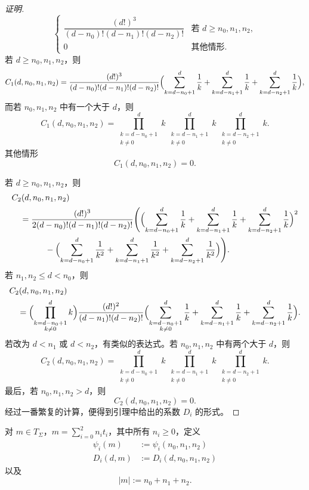 \begin{proof}[证明]
\[\begin{cases}
    \dfrac{(d!)^3}{(d-n_0)!(d-n_1)!(d-n_2)!} & \text{若 } d\ge n_0,n_1,n_2,\\[2mm]
    0 & \text{其他情形}.
  \end{cases}
\]
若 $d\ge n_0,n_1,n_2$，则
\[
  C_1(d,n_0,n_1,n_2)=\frac{(d!)^3}{(d-n_0)!(d-n_1)!(d-n_2)!}
  \Bigl(\sum_{k=d-n_0+1}^{d}\frac1k+\sum_{k=d-n_1+1}^{d}\frac1k+\sum_{k=d-n_2+1}^{d}\frac1k\Bigr),
\]
而若 $n_0,n_1,n_2$ 中有一个大于 $d$，则
\[
  C_1(d,n_0,n_1,n_2)=\prod_{\substack{k=d-n_0+1\\ k\ne 0}}^{d}k\ \prod_{\substack{k=d-n_1+1\\ k\ne 0}}^{d}k\ \prod_{\substack{k=d-n_2+1\\ k\ne 0}}^{d}k.
\]
其他情形
\[
  C_1(d,n_0,n_1,n_2)=0.
\]

若 $d\ge n_0,n_1,n_2$，则
\begin{align*}
  &C_2(d,n_0,n_1,n_2)\\
  &\quad =\frac{(d!)^3}{2(d-n_0)!(d-n_1)!(d-n_2)!}
    \Biggl(\Bigl(\sum_{k=d-n_0+1}^{d}\frac1k+\sum_{k=d-n_1+1}^{d}\frac1k+\sum_{k=d-n_2+1}^{d}\frac1k\Bigr)^2\\
  &\qquad\qquad -\Bigl(\sum_{k=d-n_0+1}^{d}\frac1{k^2}+\sum_{k=d-n_1+1}^{d}\frac1{k^2}+\sum_{k=d-n_2+1}^{d}\frac1{k^2}\Bigr)\Biggr).
\end{align*}
若 $n_1,n_2\le d<n_0$，则
\begin{align*}
  &C_2(d,n_0,n_1,n_2)\\
  &\quad =\Bigl(\prod_{\substack{k=d-n_0+1\\ k\ne 0}}^{d}k\Bigr)\frac{(d!)^2}{(d-n_1)!(d-n_2)!}
    \Bigl(\sum_{\substack{k=d-n_0+1\\ k\ne 0}}^{d}\frac1k+\sum_{k=d-n_1+1}^{d}\frac1k+\sum_{k=d-n_2+1}^{d}\frac1k\Bigr).
\end{align*}
若改为 $d<n_1$ 或 $d<n_2$，有类似的表达式。若 $n_0,n_1,n_2$ 中有两个大于 $d$，则
\[
  C_2(d,n_0,n_1,n_2)=\prod_{\substack{k=d-n_0+1\\ k\ne 0}}^{d}k\ \prod_{\substack{k=d-n_1+1\\ k\ne 0}}^{d}k\ \prod_{\substack{k=d-n_2+1\\ k\ne 0}}^{d}k.
\]
最后，若 $n_0,n_1,n_2>d$，则
\[
  C_2(d,n_0,n_1,n_2)=0.
\]
经过一番繁复的计算，便得到引理中给出的系数 $D_i$ 的形式。
\end{proof}

\begin{definition}
  对 $m\in T_\Sigma$，$m=\sum_{i=0}^2n_it_i$，其中所有 $n_i\ge 0$，定义
  \begin{align*}
    \psi_i(m)&:=\psi_i(n_0,n_1,n_2)\\
    D_i(d,m)&:=D_i(d,n_0,n_1,n_2)
  \end{align*}
  以及
  \[
    |m|:=n_0+n_1+n_2.
  \]
\end{definition}


